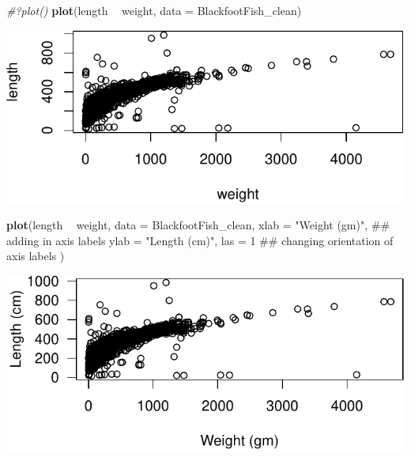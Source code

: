 \documentclass[]{article}
\newenvironment{Shaded}{\begin{snugshade}}{\end{snugshade}}
\newcommand{\KeywordTok}[1]{\textcolor[rgb]{0.13,0.29,0.53}{\textbf{#1}}}
\newcommand{\DataTypeTok}[1]{\textcolor[rgb]{0.13,0.29,0.53}{#1}}
\newcommand{\DecValTok}[1]{\textcolor[rgb]{0.00,0.00,0.81}{#1}}
\newcommand{\StringTok}[1]{\textcolor[rgb]{0.31,0.60,0.02}{#1}}
\newcommand{\CommentTok}[1]{\textcolor[rgb]{0.56,0.35,0.01}{\textit{#1}}}
\newcommand{\OperatorTok}[1]{\textcolor[rgb]{0.81,0.36,0.00}{\textbf{#1}}}
\newcommand{\NormalTok}[1]{#1}
\begin{document}
\vspace{0.25cm}

\begin{Shaded}
\begin{Highlighting}[]
\CommentTok{#?plot()}
\KeywordTok{plot}\NormalTok{(length }\OperatorTok{~}\StringTok{ }\NormalTok{weight, }
     \DataTypeTok{data =}\NormalTok{ BlackfootFish_clean) }
\end{Highlighting}
\end{Shaded}

\begin{center}\includegraphics{RTutorial_files/figure-latex/scatter1-1} \end{center}

\newpage

\begin{Shaded}
\begin{Highlighting}[]
\KeywordTok{plot}\NormalTok{(length }\OperatorTok{~}\StringTok{ }\NormalTok{weight, }
     \DataTypeTok{data =}\NormalTok{ BlackfootFish_clean, }
     \DataTypeTok{xlab =} \StringTok{"Weight (gm)"}\NormalTok{, ## adding in axis labels}
     \DataTypeTok{ylab =} \StringTok{"Length (cm)"}\NormalTok{, }
     \DataTypeTok{las =} \DecValTok{1}\NormalTok{ ## changing orientation of axis labels}
\NormalTok{     ) }
\end{Highlighting}
\end{Shaded}

\begin{center}\includegraphics{RTutorial_files/figure-latex/scatter2-1} \end{center}
\end{document}
